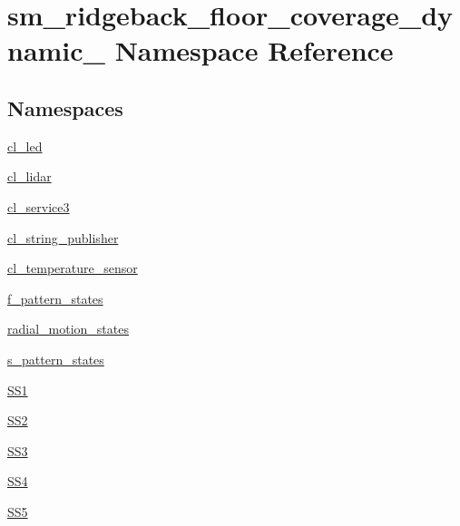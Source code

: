 \hypertarget{namespacesm__ridgeback__floor__coverage__dynamic__1}{}\section{sm\+\_\+ridgeback\+\_\+floor\+\_\+coverage\+\_\+dynamic\+\_ Namespace Reference}
\label{namespacesm__ridgeback__floor__coverage__dynamic__1}
\subsection*{Namespaces}
\begin{DoxyCompactItemize}
\item 
 \hyperlink{namespacesm__ridgeback__floor__coverage__dynamic__1_1_1cl__led}{cl\+\_\+led}
\item 
 \hyperlink{namespacesm__ridgeback__floor__coverage__dynamic__1_1_1cl__lidar}{cl\+\_\+lidar}
\item 
 \hyperlink{namespacesm__ridgeback__floor__coverage__dynamic__1_1_1cl__service3}{cl\+\_\+service3}
\item 
 \hyperlink{namespacesm__ridgeback__floor__coverage__dynamic__1_1_1cl__string__publisher}{cl\+\_\+string\+\_\+publisher}
\item 
 \hyperlink{namespacesm__ridgeback__floor__coverage__dynamic__1_1_1cl__temperature__sensor}{cl\+\_\+temperature\+\_\+sensor}
\item 
 \hyperlink{namespacesm__ridgeback__floor__coverage__dynamic__1_1_1f__pattern__states}{f\+\_\+pattern\+\_\+states}
\item 
 \hyperlink{namespacesm__ridgeback__floor__coverage__dynamic__1_1_1radial__motion__states}{radial\+\_\+motion\+\_\+states}
\item 
 \hyperlink{namespacesm__ridgeback__floor__coverage__dynamic__1_1_1s__pattern__states}{s\+\_\+pattern\+\_\+states}
\item 
 \hyperlink{namespacesm__ridgeback__floor__coverage__dynamic__1_1_1SS1}{S\+S1}
\item 
 \hyperlink{namespacesm__ridgeback__floor__coverage__dynamic__1_1_1SS2}{S\+S2}
\item 
 \hyperlink{namespacesm__ridgeback__floor__coverage__dynamic__1_1_1SS3}{S\+S3}
\item 
 \hyperlink{namespacesm__ridgeback__floor__coverage__dynamic__1_1_1SS4}{S\+S4}
\item 
 \hyperlink{namespacesm__ridgeback__floor__coverage__dynamic__1_1_1SS5}{S\+S5}
\end{DoxyCompactItemize}
